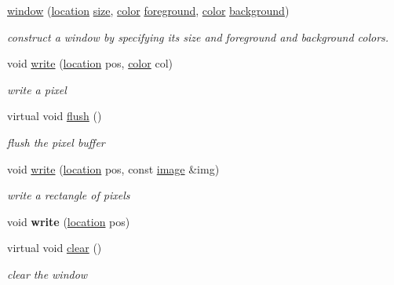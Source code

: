 \begin{DoxyCompactItemize}
\item 
\mbox{\label{classhwlib_1_1window_a5acfb1afba5adade79ae1576831128f1}} 
\hyperlink{classhwlib_1_1window_a5acfb1afba5adade79ae1576831128f1}{window} (\hyperlink{classhwlib_1_1location}{location} \hyperlink{classhwlib_1_1window_ad2ad5281c9c09d18010b19cb807d3eaa}{size}, \hyperlink{classhwlib_1_1color}{color} \hyperlink{classhwlib_1_1window_a812e3bf440309bf3280d34fa04eeb718}{foreground}, \hyperlink{classhwlib_1_1color}{color} \hyperlink{classhwlib_1_1window_a1ca47e79ec54ea8b2f38b41b42593d2d}{background})
\begin{DoxyCompactList}\small\item\em construct a window by specifying its size and foreground and background colors. \end{DoxyCompactList}\item 
void \hyperlink{classhwlib_1_1window_a65122042afeb55e41e5c03b5c8e26fff}{write} (\hyperlink{classhwlib_1_1location}{location} pos, \hyperlink{classhwlib_1_1color}{color} col)
\begin{DoxyCompactList}\small\item\em write a pixel \end{DoxyCompactList}\item 
virtual void \hyperlink{classhwlib_1_1window_a2b654a98872d174173e1df24a444c949}{flush} ()
\begin{DoxyCompactList}\small\item\em flush the pixel buffer \end{DoxyCompactList}\item 
void \hyperlink{classhwlib_1_1window_ac87b3f0e82ab260f95a68e76f827d03b}{write} (\hyperlink{classhwlib_1_1location}{location} pos, const \hyperlink{classhwlib_1_1image}{image} \&img)
\begin{DoxyCompactList}\small\item\em write a rectangle of pixels \end{DoxyCompactList}\item 
\mbox{\label{classhwlib_1_1window_ac90b74315df62b9952ce2ee3af95825b}} 
void {\bfseries write} (\hyperlink{classhwlib_1_1location}{location} pos)
\item 
virtual void \hyperlink{classhwlib_1_1window_a5e781163353ce26cb4dc5b2cbe40ad05}{clear} ()
\begin{DoxyCompactList}\small\item\em clear the window \end{DoxyCompactList}\item 

\end{DoxyCompactItemize}
